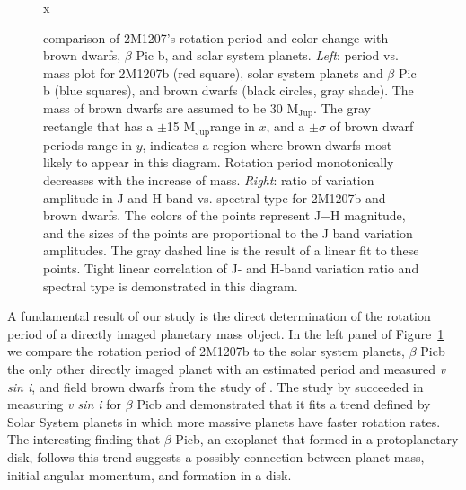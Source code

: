 \documentclass[apj]{emulateapj}
\newcommand{\bpic}{$\beta$ Pic}
\newcommand{\vsini}{$v\sin i$}
\newcommand{\mjup}{M$_{\mbox{Jup}}$}
\begin{document}
\begin{figure}
  \centering
  \caption{comparison of 2M1207's rotation period and color change with brown
    dwarfs, \bpic{} b, and solar system planets. {\em Left}: period vs. mass
  plot for 2M1207b (red square), solar system planets and \bpic{} b
  (blue squares), and brown dwarfs (black circles, gray shade). The mass of brown
  dwarfs are assumed to be 30 \mjup{}. The gray rectangle that has
a  $\pm$15 \mjup range in $x$, and a $\pm \sigma$ of brown dwarf
periods range in $y$, indicates a
region where brown dwarfs most likely to appear in this
diagram. Rotation period monotonically decreases with the increase of
mass. {\em Right}: ratio
of variation amplitude in J and H band vs. spectral type for 2M1207b
and brown dwarfs. The colors of the points represent J$-$H magnitude,
and the sizes of the points are proportional to the J band variation
amplitudes. The gray dashed line is the result of a linear fit to
these points. Tight linear correlation of J- and H-band variation ratio
and spectral type is demonstrated in this diagram.}
x \label{fig:5}
\end{figure}


A fundamental result of our study is the direct determination of the
rotation period of a directly imaged planetary mass object. In the
left panel of Figure~\ref{fig:5} we compare the rotation period of
2M1207b to the solar system planets, \bpic b the only other directly
imaged planet with an estimated period and measured {\em v sin i}, and
field brown dwarfs from the study of \citep[][]{Metchev2015}.  The
study by \citep[][]{Snellen2014} succeeded in measuring {\em v sin i}
for \bpic b and demonstrated that it fits a trend defined by Solar
System planets in which more massive planets have faster rotation
rates. The interesting finding that \bpic b, an exoplanet that formed
in a protoplanetary disk, follows this trend suggests a possibly
connection between planet mass, initial angular momentum, and
formation in a disk.
\end{document}
